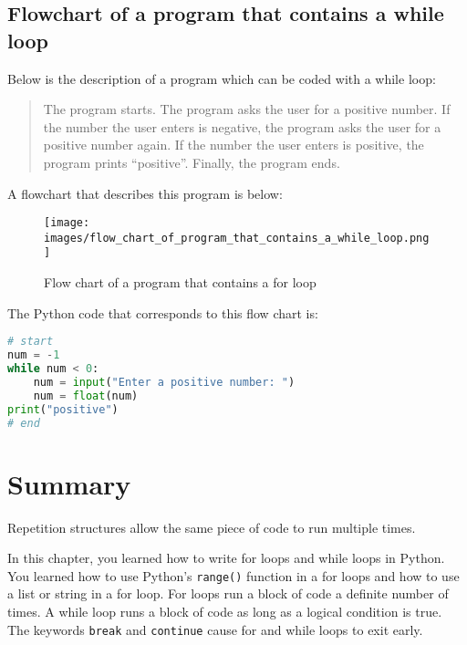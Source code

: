 \documentclass{book}
\makeatletter
\def\maxwidth{\ifdim\Gin@nat@width>\linewidth\linewidth
\else\Gin@nat@width\fi}
\let\Oldincludegraphics\includegraphics
\renewcommand{\includegraphics}[1]{\Oldincludegraphics[width=.8\maxwidth]{#1}}
\newcommand{\passthrough}[1]{#1}
\makeatother
\begin{document}
    
        \hypertarget{flowchart-of-a-program-that-contains-a-while-loop}{%
\subsection{Flowchart of a program that contains a while
loop}\label{flowchart-of-a-program-that-contains-a-while-loop}}
    




    
        Below is the description of a program which can be coded with a while
loop:

\begin{quote}
The program starts. The program asks the user for a positive number. If
the number the user enters is negative, the program asks the user for a
positive number again. If the number the user enters is positive, the
program prints ``positive''. Finally, the program ends.
\end{quote}

A flowchart that describes this program is below:

\begin{figure}
\centering
\texttt{[image: images/flow\_chart\_of\_program\_that\_contains\_a\_while\_loop.png]}
\caption{Flow chart of a program that contains a for loop}
\end{figure}

The Python code that corresponds to this flow chart is:

\begin{lstlisting}[language=Python]
# start
num = -1
while num < 0:
    num = input("Enter a positive number: ")
    num = float(num)
print("positive")
# end
\end{lstlisting}
    




    
        \newpage
        \hypertarget{summary}{%
\section{Summary}\label{summary}}

    




    
        Repetition structures allow the same piece of code to run multiple
times.

In this chapter, you learned how to write for loops and while loops in
Python. You learned how to use Python's
\passthrough{\lstinline!range()!} function in a for loops and how to use
a list or string in a for loop. For loops run a block of code a definite
number of times. A while loop runs a block of code as long as a logical
condition is true. The keywords \passthrough{\lstinline!break!} and
\passthrough{\lstinline!continue!} cause for and while loops to exit
early.
\end{document}
